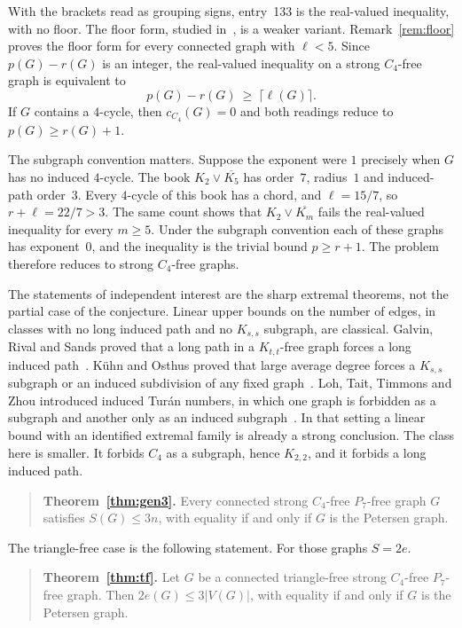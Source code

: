 \documentclass[ASNA]{USG}
\theoremstyle{WBstyletwo}
\numberwithin{equation}{section}
\newcommand{\lr}{\ell}
\newcommand{\pp}{p}
\begin{document}
With the brackets read as grouping signs, entry~133 is the real-valued inequality, with no floor. The floor form, studied in~\cite{chen}, is a weaker variant. Remark~\ref{rem:floor} proves the floor form for every connected graph with $\lr<5$. Since $\pp(G)-r(G)$ is an integer, the real-valued inequality on a strong $C_4$-free graph is equivalent to
\begin{equation}\label{eq:target}
\pp(G)-r(G)\ \ge\ \lceil \lr(G)\rceil .
\end{equation}
If $G$ contains a $4$-cycle, then $c_{C_4}(G)=0$ and both readings reduce to $\pp(G)\ge r(G)+1$.

The subgraph convention matters. Suppose the exponent were $1$ precisely when $G$ has no induced $4$-cycle. The book $K_2\vee\overline{K_5}$ has order~$7$, radius~$1$ and induced-path order~$3$. Every $4$-cycle of this book has a chord, and $\lr=15/7$, so $r+\lr=22/7>3$. The same count shows that $K_2\vee\overline{K_m}$ fails the real-valued inequality for every $m\ge 5$. Under the subgraph convention each of these graphs has exponent~$0$, and the inequality is the trivial bound $\pp\ge r+1$. The problem therefore reduces to strong $C_4$-free graphs.

The statements of independent interest are the sharp extremal theorems, not the partial case of the conjecture. Linear upper bounds on the number of edges, in classes with no long induced path and no $K_{s,s}$ subgraph, are classical. Galvin, Rival and Sands proved that a long path in a $K_{t,t}$-free graph forces a long induced path~\cite{grs}. K\"uhn and Osthus proved that large average degree forces a $K_{s,s}$ subgraph or an induced subdivision of any fixed graph~\cite{ko}. Loh, Tait, Timmons and Zhou introduced induced Tur\'an numbers, in which one graph is forbidden as a subgraph and another only as an induced subgraph~\cite{lttz}. In that setting a linear bound with an identified extremal family is already a strong conclusion. The class here is smaller. It forbids $C_4$ as a subgraph, hence $K_{2,2}$, and it forbids a long induced path.

\begin{quote}
\textbf{Theorem~\ref{thm:gen3}.}
Every connected strong $C_4$-free $P_7$-free graph $G$ satisfies $S(G)\le 3n$, with equality if and only if $G$ is the Petersen graph.
\end{quote}

\noindent The triangle-free case is the following statement. For those graphs $S=2e$.

\begin{quote}
\textbf{Theorem~\ref{thm:tf}.}
Let $G$ be a connected triangle-free strong $C_4$-free $P_7$-free graph. Then $2e(G)\le 3|V(G)|$, with equality if and only if $G$ is the Petersen graph.
\end{quote}
\end{document}
